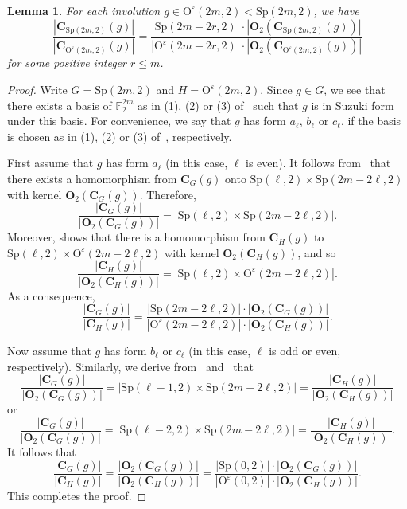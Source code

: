 \documentclass[11pt,a4paper,reqno]{amsart}
\newcommand{\rmO}{\mathrm{O}}
\newcommand{\Sp}{\mathrm{Sp}}
\newtheorem{lemma}[theorem]{Lemma}
\theoremstyle{definition}
\begin{document}
\begin{lemma}\label{lemspo}
For each involution $g\in\rmO^{\varepsilon}(2m,2)<\Sp(2m,2)$, we have
\[
\frac{|\mathbf{C}_{\Sp(2m,2)}(g)|}{|\mathbf{C}_{\rmO^{\varepsilon}(2m,2)}(g)|}
=\frac{|\Sp(2m-2r,2)|\cdot|\mathbf{O}_2\left(\mathbf{C}_{\Sp(2m,2)}(g)\right)|}
{|\rmO^{\varepsilon}(2m-2r,2)|\cdot|\mathbf{O}_2\left(\mathbf{C}_{\rmO^{\varepsilon}(2m,2)}(g)\right)|}
\]
for some positive integer $r\leq m$.
\end{lemma}

\begin{proof}
Write $G=\Sp(2m,2)$ and $H=\rmO^{\varepsilon}(2m,2)$.
Since $g\in G$, we see that there exists a basis of $\mathbb{F}^{2m}_2$ as in (1), (2) or (3) of~\cite[(7.6)]{AS1976} such that $g$ is in Suzuki form under this basis. For convenience, we say that $g$ has form $a_\ell$, $b_\ell$ or $c_\ell$, if the basis is chosen as in (1), (2) or (3) of~\cite[(7.6)]{AS1976}, respectively.

First assume that $g$ has form $a_\ell$ (in this case, $\ell$ is even).
It follows from~\cite[(7.9)]{AS1976} that there exists a homomorphism from $\mathbf{C}_G(g)$ onto $\Sp(\ell,2)\times\Sp(2m-2\ell,2)$ with kernel $\mathbf{O}_2\left(\mathbf{C}_{G}(g)\right)$. Therefore,
\[
\frac{|\mathbf{C}_{G}(g)|}{|\mathbf{O}_2\left(\mathbf{C}_{G}(g)\right)|}=|\Sp(\ell,2)\times\Sp(2m-2\ell,2)|.
\]
Moreover, \cite[(8.6)]{AS1976} shows that there is a homomorphism from $\mathbf{C}_{H}(g)$ to $\Sp(\ell,2)\times\rmO^{\varepsilon}(2m-2\ell,2)$ with kernel $\mathbf{O}_2\left(\mathbf{C}_{H}(g)\right)$, and so
\[
\frac{|\mathbf{C}_{H}(g)|}{|\mathbf{O}_2\left(\mathbf{C}_{H}(g)\right)|}=|\Sp(\ell,2)\times\rmO^{\varepsilon}(2m-2\ell,2)|.
\]
As a consequence,
\[
\frac{|\mathbf{C}_{G}(g)|}{|\mathbf{C}_{H}(g)|}
=\frac{|\Sp(2m-2\ell,2)|\cdot|\mathbf{O}_2\left(\mathbf{C}_{G}(g)\right)|}
{|\rmO^{\varepsilon}(2m-2\ell,2)|\cdot|\mathbf{O}_2\left(\mathbf{C}_{H}(g)\right)|}.
\]

Now assume that $g$ has form $b_\ell$ or $c_\ell$ (in this case, $\ell$ is odd or even, respectively).
Similarly, we derive from~\cite[(7.10)~and~(7.11)]{AS1976} and~\cite[(8.7)~and~(8.8)]{AS1976} that
\[
\frac{|\mathbf{C}_{G}(g)|}{|\mathbf{O}_2\left(\mathbf{C}_{G}(g)\right)|}=|\Sp(\ell-1,2)\times\Sp(2m-2\ell,2)|=
\frac{|\mathbf{C}_{H}(g)|}{|\mathbf{O}_2\left(\mathbf{C}_{H}(g)\right)|}
\]
or
\[
\frac{|\mathbf{C}_{G}(g)|}{|\mathbf{O}_2\left(\mathbf{C}_{G}(g)\right)|}=|\Sp(\ell-2,2)\times\Sp(2m-2\ell,2)|=
\frac{|\mathbf{C}_{H}(g)|}{|\mathbf{O}_2\left(\mathbf{C}_{H}(g)\right)|}.
\]
It follows that
\[
\frac{|\mathbf{C}_{G}(g)|}{|\mathbf{C}_{H}(g)|}=\frac{|\mathbf{O}_2\left(\mathbf{C}_{G}(g)\right)|}{|\mathbf{O}_2\left(\mathbf{C}_{H}(g)\right)|}
=\frac{|\Sp(0,2)|\cdot|\mathbf{O}_2\left(\mathbf{C}_{G}(g)\right)|}
{|\rmO^{\varepsilon}(0,2)|\cdot|\mathbf{O}_2\left(\mathbf{C}_{H}(g)\right)|}.
\]
This completes the proof.
\end{proof}
\end{document}
